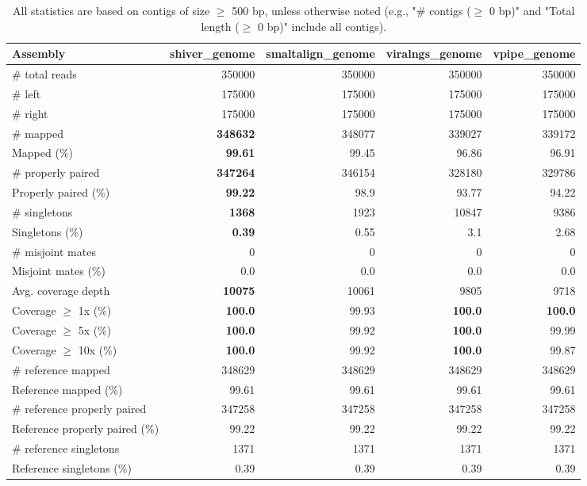 \documentclass[12pt,a4paper]{article}
\begin{document}
\begin{table}[ht]
\begin{center}
\caption{All statistics are based on contigs of size $\geq$ 500 bp, unless otherwise noted (e.g., "\# contigs ($\geq$ 0 bp)" and "Total length ($\geq$ 0 bp)" include all contigs).}
\begin{tabular}{|l*{4}{|r}|}
\hline
Assembly & shiver\_genome & smaltalign\_genome & viralngs\_genome & vpipe\_genome \\ \hline
\# total reads & 350000 & 350000 & 350000 & 350000 \\ \hline
\# left & 175000 & 175000 & 175000 & 175000 \\ \hline
\# right & 175000 & 175000 & 175000 & 175000 \\ \hline
\# mapped & {\bf 348632} & 348077 & 339027 & 339172 \\ \hline
Mapped (\%) & {\bf 99.61} & 99.45 & 96.86 & 96.91 \\ \hline
\# properly paired & {\bf 347264} & 346154 & 328180 & 329786 \\ \hline
Properly paired (\%) & {\bf 99.22} & 98.9 & 93.77 & 94.22 \\ \hline
\# singletons & {\bf 1368} & 1923 & 10847 & 9386 \\ \hline
Singletons (\%) & {\bf 0.39} & 0.55 & 3.1 & 2.68 \\ \hline
\# misjoint mates & 0 & 0 & 0 & 0 \\ \hline
Misjoint mates (\%) & 0.0 & 0.0 & 0.0 & 0.0 \\ \hline
Avg. coverage depth & {\bf 10075} & 10061 & 9805 & 9718 \\ \hline
Coverage $\geq$ 1x (\%) & {\bf 100.0} & 99.93 & {\bf 100.0} & {\bf 100.0} \\ \hline
Coverage $\geq$ 5x (\%) & {\bf 100.0} & 99.92 & {\bf 100.0} & 99.99 \\ \hline
Coverage $\geq$ 10x (\%) & {\bf 100.0} & 99.92 & {\bf 100.0} & 99.87 \\ \hline
\# reference mapped & 348629 & 348629 & 348629 & 348629 \\ \hline
Reference mapped (\%) & 99.61 & 99.61 & 99.61 & 99.61 \\ \hline
\# reference properly paired & 347258 & 347258 & 347258 & 347258 \\ \hline
Reference properly paired (\%) & 99.22 & 99.22 & 99.22 & 99.22 \\ \hline
\# reference singletons & 1371 & 1371 & 1371 & 1371 \\ \hline
Reference singletons (\%) & 0.39 & 0.39 & 0.39 & 0.39 \\ \hline

\end{tabular}
\end{center}
\end{table}
\end{document}
